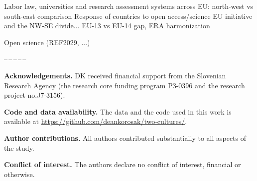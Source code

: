 \documentclass[amsfonts, amssymb, prl, superscriptaddress, notitlepage, twocolumn, nofootinbib]{revtex4-2}
\begin{document}
Labor law, universities and research assessment systems across EU: north-west vs south-east comparison 
Response of countries to open access/science EU initiative and the NW-SE divide... EU-13 vs EU-14 gap, ERA harmonization

Open science (REF2029, ...)
  
\begin{center}
--\,--\,--\,--\,--
\end{center}
\vspace{1mm}
\noindent\textbf{Acknowledgements.} DK received financial support from the Slovenian Research Agency (the research core funding program P3-0396 and the research project no.J7-3156). 

\noindent\textbf{Code and data availability.} The data and the code used in this work is available at \url{https://github.com/deankorosak/two-cultures/}.

\noindent\textbf{Author contributions.} All authors contributed substantially to all aspects of the study.

\noindent\textbf{Conflict of interest.} The authors declare no conflict of interest, financial or otherwise.


{}

\end{document}
